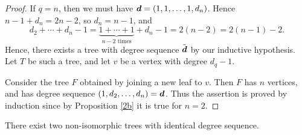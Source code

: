 \documentclass{unswmaths}
\begin{document}
\begin{proof}
    If $q = n$, then we must have $\boldsymbol{d} = (1,1,\ldots,1,d_n)$. Hence $n-1+d_n = 2n-2$, so
    $d_n = n-1$, and 
    \begin{equation}
        d_2 + \cdots + d_n-1 = \underbrace{1+\cdots+1}_{n-2\text{ times}}+d_n-1 = 2(n-2)  = 2(n-1)-2.
    \end{equation}
    Hence, there exists a tree with degree sequence $\tilde{\boldsymbol{d}}$ by our inductive
    hypothesis. Let $T$ be such a tree, and let $v$ be a vertex
    with degree $d_q - 1$. 
    
    Consider the tree $F$ obtained by joining a new leaf to $v$. Then $F$
    has $n$ vertices, and has degree sequence $(1,d_2,\ldots,d_n) = \boldsymbol{d}$.
    Thus the assertion is proved by induction since by Proposition \ref{2b} it is true for $n=2$.
\end{proof}
\begin{proposition}[Part (d)]
\label{2d}
    There exist two non-isomorphic trees with identical degree sequence.
\end{proposition}
\end{document}
